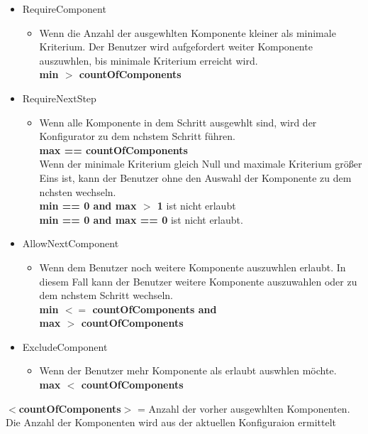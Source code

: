 \documentclass{article}
\begin{document}
\begin{itemize}
    \item RequireComponent 
    \begin{itemize}
        \item Wenn die Anzahl der ausgewhlten Komponente kleiner als minimale
        Kriterium. Der Benutzer wird aufgefordert weiter Komponente
        auszuwhlen, bis minimale Kriterium erreicht wird.\\
        \textbf{min $>$ countOfComponents}
    \end{itemize}
    \item RequireNextStep
        \begin{itemize}
            \item Wenn alle Komponente in dem Schritt ausgewhlt sind, wird
            der Konfigurator zu dem nchstem Schritt f\"uhren.\\
            \textbf{max == countOfComponents}\\
            Wenn der minimale Kriterium gleich Null und maximale Kriterium
            gr\"o\ss{}er Eins ist, kann der Benutzer ohne den Auswahl der
            Komponente zu dem nchsten wechseln.\\
            \textbf{min == 0 and max $>$ 1} ist nicht erlaubt\\
            \textbf{min == 0 and max == 0} ist nicht erlaubt.
        \end{itemize}
    \item AllowNextComponent
    \begin{itemize}
        \item  Wenn dem Benutzer noch weitere Komponente auszuwhlen erlaubt.
        In diesem Fall kann der Benutzer weitere Komponente auszuwahlen oder zu
        dem nchstem Schritt wechseln.\\
        \textbf{min $<=$ countOfComponents and\\ max $>$ countOfComponents}
    \end{itemize}
\item ExcludeComponent
    \begin{itemize}
        \item Wenn der Benutzer mehr Komponente als erlaubt auswhlen
        möchte.\\
        \textbf{max $<$ countOfComponents}
    \end{itemize}
\end{itemize}

\noindent\textbf{$<$countOfComponents$>$} = Anzahl der vorher
ausgewhlten Komponenten.
Die Anzahl der Komponenten wird aus der aktuellen Konfiguraion ermittelt\\\\
\end{document}
